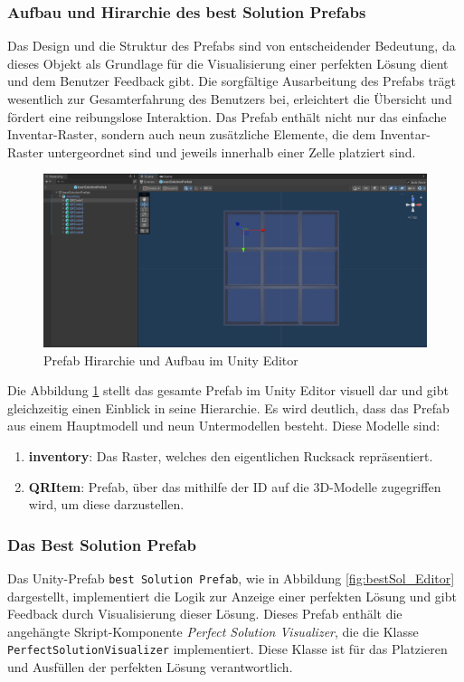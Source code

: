 \begin{itemize}
\subsubsection{Aufbau und Hirarchie des best Solution Prefabs}
Das Design und die Struktur des Prefabs sind von entscheidender Bedeutung, da dieses Objekt als Grundlage für die
Visualisierung einer perfekten Lösung dient und dem Benutzer Feedback gibt. Die sorgfältige Ausarbeitung des Prefabs
trägt wesentlich zur Gesamterfahrung des Benutzers bei, erleichtert die Übersicht und fördert eine reibungslose Interaktion.
Das Prefab enthält nicht nur das einfache Inventar-Raster, sondern auch neun zusätzliche Elemente, die dem Inventar-Raster
untergeordnet sind und jeweils innerhalb einer Zelle platziert sind.
\begin{figure}[H]
    \centering
    \includegraphics[scale=0.3]{images/prefShow}
    \caption{Prefab Hirarchie und Aufbau im Unity Editor}
    \label{fig:InvPref}
\end{figure}
Die Abbildung \ref{fig:InvPref} stellt das gesamte Prefab im Unity Editor visuell dar und gibt gleichzeitig einen Einblick
in seine Hierarchie. Es wird deutlich, dass das Prefab aus einem Hauptmodell und neun Untermodellen besteht. Diese Modelle sind:
\begin{enumerate}
    \item \textbf{inventory}: Das Raster, welches den eigentlichen Rucksack repräsentiert.

    \item \textbf{QRItem}: Prefab, über das mithilfe der ID auf die 3D-Modelle zugegriffen wird, um diese darzustellen.
\end{enumerate}

\subsubsection{Das Best Solution Prefab}
Das Unity-Prefab \texttt{best Solution Prefab}, wie in Abbildung \ref{fig:bestSol_Editor} dargestellt, implementiert die
Logik zur Anzeige einer perfekten Lösung und gibt Feedback durch Visualisierung dieser Lösung. Dieses Prefab enthält die
angehängte Skript-Komponente \textit{Perfect Solution Visualizer}, die die Klasse \texttt{PerfectSolutionVisualizer}
implementiert. Diese Klasse ist für das Platzieren und Ausfüllen der perfekten Lösung verantwortlich.


\end{itemize}

